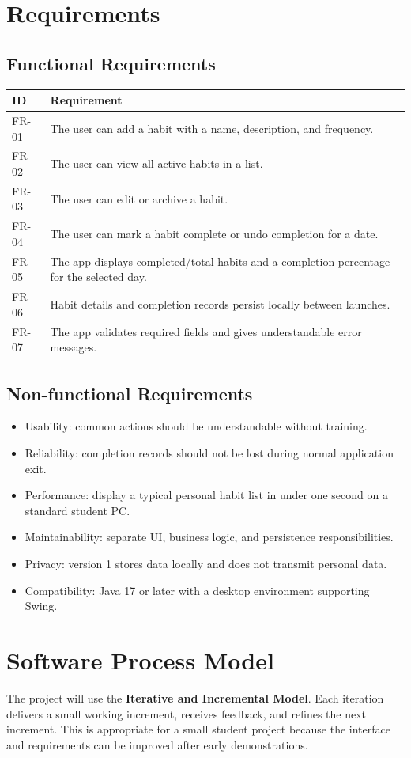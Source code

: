 \documentclass[11pt,a4paper]{article}
\begin{document}
\section{Requirements}
\subsection{Functional Requirements}
\begin{tabularx}{\linewidth}{p{1.5cm}X}
\toprule
ID & Requirement\\ \midrule
FR-01 & The user can add a habit with a name, description, and frequency.\\
FR-02 & The user can view all active habits in a list.\\
FR-03 & The user can edit or archive a habit.\\
FR-04 & The user can mark a habit complete or undo completion for a date.\\
FR-05 & The app displays completed/total habits and a completion percentage for the selected day.\\
FR-06 & Habit details and completion records persist locally between launches.\\
FR-07 & The app validates required fields and gives understandable error messages.\\
\bottomrule
\end{tabularx}
\subsection{Non-functional Requirements}
\begin{itemize}
\item Usability: common actions should be understandable without training.
\item Reliability: completion records should not be lost during normal application exit.
\item Performance: display a typical personal habit list in under one second on a standard student PC.
\item Maintainability: separate UI, business logic, and persistence responsibilities.
\item Privacy: version 1 stores data locally and does not transmit personal data.
\item Compatibility: Java 17 or later with a desktop environment supporting Swing.
\end{itemize}

\section{Software Process Model}
The project will use the \textbf{Iterative and Incremental Model}. Each iteration delivers a small working increment, receives feedback, and refines the next increment. This is appropriate for a small student project because the interface and requirements can be improved after early demonstrations.
\end{document}
